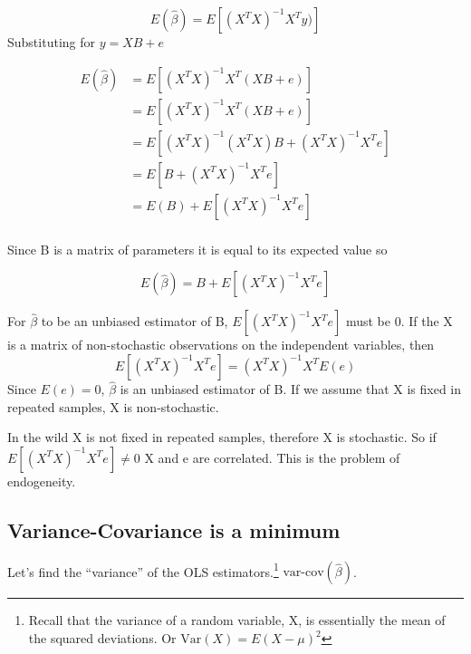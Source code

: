 \documentclass[]{book}
\let\rmarkdownfootnote\footnote%
\def\footnote{\protect\rmarkdownfootnote}
\begin{document}
\[E(\hat{\beta}) = E\left[(X^TX)^{-1}X^Ty)\right]\]
Substituting for \(y=XB+e\)

\[\begin{aligned}
E(\hat{\beta}) &= E\left[(X^TX)^{-1}X^T(XB+e)\right]\\
&=E\left[(X^TX)^{-1}X^T(XB+e)\right]\\
&=E\left[(X^TX)^{-1}(X^TX)B+(X^TX)^{-1}X^Te\right]\\
&=E\left[B+(X^TX)^{-1}X^Te\right]\\
&=E(B) + E\left[(X^TX)^{-1}X^Te\right]\\
\end{aligned}\]

Since B is a matrix of parameters it is equal to its expected value so

\[E(\hat{\beta}) = B + E\left[(X^TX)^{-1}X^Te\right]\]

For \(\hat{\beta}\) to be an unbiased estimator of B, \(E\left[(X^TX)^{-1}X^Te\right]\) must be \(0\). If the X is a matrix of non-stochastic observations on the independent variables, then
\[E\left[(X^TX)^{-1}X^Te\right] = (X^TX)^{-1}X^TE(e)\] Since \(E(e)=0\), \(\hat{\beta}\) is an unbiased estimator of B. If we assume that X is fixed in repeated samples, X is non-stochastic.

In the wild X is not fixed in repeated samples, therefore X is stochastic. So if \(E\left[(X^TX)^{-1}X^Te\right]\ne0\) X and e are correlated. This is the problem of endogeneity.

\hypertarget{variance-covariance-is-a-minimum}{%
\subsection{Variance-Covariance is a minimum}\label{variance-covariance-is-a-minimum}}

Let's find the ``variance'' of the OLS estimators.\footnote{Recall that the variance of a random variable, X, is essentially the mean of the squared deviations. Or \(\text{Var}(X) = E(X-\mu)^2\)} \(\text{var-cov}(\hat{\beta})\).
\end{document}
